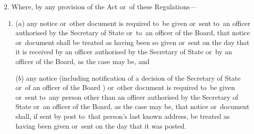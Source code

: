 \documentclass[12pt,a4paper]{article}
\begin{document}
2.  Where, by any provision of the Act%
%
or~of these Regulations—
\begin{enumerate}\item[]
($a$) any notice or~other document is required to~be given or~sent 
to~an officer authorised by the Secretary of State
or~to~an officer of the Board,  %
that notice or~document shall be treated as having been so given or~sent on the day that it is received 
by an officer authorised by the Secretary of State
or~by an officer of the Board,  %
as the case may be, and

($b$) any notice (including notification of a decision of the Secretary of State
or~of an officer of the Board%
) or~other document is required to~be given or~sent to~any person other than 
an officer  %
authorised by the Secretary of State
or~an officer of the Board,  %
as the case may be, that notice or~document shall, if sent by post to~that person’s last known address, be treated as having been given or~sent on the day that it was posted.
\end{enumerate}

\end{document}
